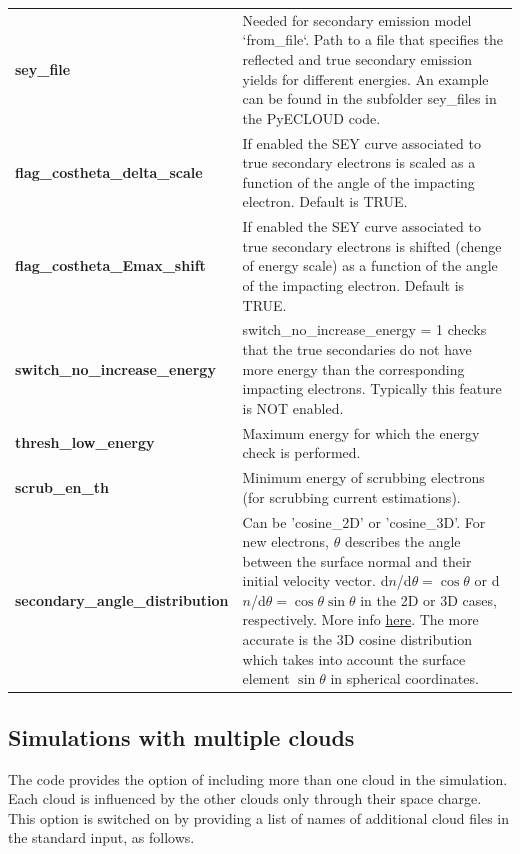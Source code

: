 \documentclass[a4paper,12pt]{article}
\begin{document}
\begin{longtable}{p{}p{}}
\hline\endfirsthead\hline\endhead\rowcolor{Gray}
\multicolumn{2}{p{.97\textwidth}}{
\textbf{Other parameters}}\\ \hline
\textbf{sey\_file} & Needed for secondary emission model `from\_file`.
    Path to a file that specifies the reflected and true secondary emission yields for different energies.
    An example can be found in the subfolder sey\_files in the PyECLOUD code.\\\hline
\textbf{flag\_costheta\_delta\_scale} & If enabled the SEY curve associated to true secondary electrons is scaled as a function of the angle of the impacting electron. Default is TRUE.\\ \hline
\textbf{flag\_costheta\_Emax\_shift} & If enabled the SEY curve associated to true secondary electrons is shifted (chenge of energy scale) as a function of the angle of the impacting electron. Default is TRUE.\\ \hline
\textbf{switch\_no\_increase\_energy}&	switch\_no\_increase\_energy = 1 checks that the true secondaries do not have more energy than the corresponding impacting electrons.
Typically this feature is NOT enabled.\\ \hline
\textbf{thresh\_low\_energy}&	Maximum energy for which the energy check is performed.\\ \hline
\textbf{scrub\_en\_th}&	Minimum energy of scrubbing electrons (for scrubbing current estimations).\\
\hline
\textbf{secondary\_angle\_distribution} & Can be 'cosine\_2D' or 'cosine\_3D'.
    For new electrons, $\theta$ describes the angle between the surface normal and their initial velocity vector.
    d$n$/d$\theta=\cos\theta$ or d$n$/d$\theta=\cos\theta\sin\theta$ in the 2D or 3D cases, respectively. More info \href{http://www.sciencedirect.com/science/article/pii/S0042207X02001732}{here}.
The more accurate is the 3D cosine distribution which takes into account the surface element $\sin\theta$ in spherical coordinates.
\\ \hline
\end{longtable}


\newpage

\subsection{Simulations with multiple clouds}
\label{sec:multicloud}

The code provides the option of including more than one cloud in the simulation. Each cloud is influenced by the other clouds only through their space charge. This option is switched on by providing a list of names of additional cloud files  in the standard input, as follows.
\end{document}
